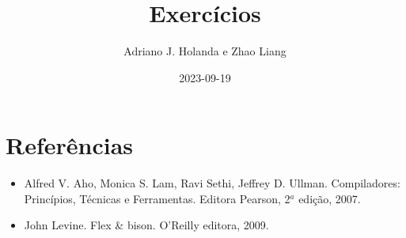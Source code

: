 \documentclass[11pt]{article}
\begin{document}
\title{Exercícios}
\author{Adriano J. Holanda e Zhao Liang}
\date{2023-09-19}
\maketitle


%

\section*{Referências}
\begin{itemize}
\item Alfred V. Aho, Monica S. Lam, Ravi Sethi, Jeffrey
  D. Ullman. Compiladores: Princípios, Técnicas e Ferramentas. Editora
  Pearson, 2$^a$ edição, 2007.
\item John Levine. Flex \& bison. O'Reilly editora, 2009.
\end{itemize}
\end{document}
